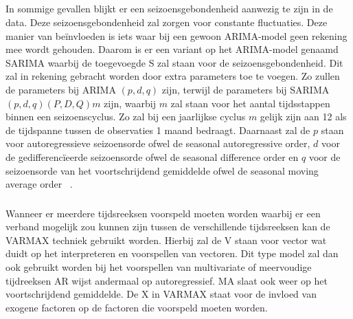 \subsection{}

\subsubsection{}

In sommige gevallen blijkt er een seizoensgebondenheid aanwezig te zijn in de data. Deze seizoensgebondenheid zal zorgen voor constante fluctuaties.
Deze manier van be\"{i}nvloeden is iets waar bij een gewoon ARIMA-model geen rekening mee wordt gehouden. Daarom is er een variant op het ARIMA-model genaamd SARIMA waarbij de toegevoegde S zal staan voor de seizoensgebondenheid. Dit zal in rekening gebracht worden door extra parameters toe te voegen. Zo zullen de parameters bij ARIMA $(p,d,q)$ zijn, terwijl de parameters bij SARIMA $(p, d, q)(P, D, Q)m$ zijn, waarbij $m$ zal staan voor het aantal tijdsstappen binnen een seizoenscyclus. Zo zal bij een jaarlijkse cyclus $m$ gelijk zijn aan 12 als de tijdspanne tussen de observaties 1 maand bedraagt. Daarnaast zal de $p$ staan voor autoregressieve seizoensorde ofwel de seasonal autoregressive order, $d$ voor de gedifferenc\"{i}eerde seizoensorde ofwel de seasonal difference order en $q$ voor de seizoensorde van het voortschrijdend gemiddelde ofwel de seasonal moving average order ~\autocite{Brownlee2018a}.

\subsubsection{}
Wanneer er meerdere tijdsreeksen voorspeld moeten worden waarbij er een verband mogelijk zou kunnen zijn tussen de verschillende tijdsreeksen kan de VARMAX techniek gebruikt worden. Hierbij zal de V staan voor vector wat duidt op het interpreteren en voorspellen van vectoren. Dit type model zal dan ook gebruikt worden bij het voorspellen van multivariate of meervoudige tijdreeksen AR wijst andermaal op autoregressief. MA slaat ook weer op het voortschrijdend gemiddelde. De X in VARMAX staat voor de invloed van exogene factoren op de factoren die voorspeld moeten worden. 

\section{}
\label{subsubsec: Theoretische toelichting van long short term memory netwerken (LSTM)}

